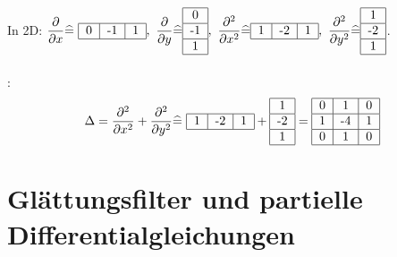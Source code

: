     In 2D: $\displaystyle \frac{\partial}{\partial x} \widehat = \ \begin{tabular}{|c|c|c|}
        \hline
        0 & -1 & 1\\
        \hline
    \end{tabular}, \ \frac{\partial}{\partial y} \widehat = \begin{tabular}{|c|}
        \hline
        0\\
        \hline
        -1\\
        \hline
        1\\
        \hline
    \end{tabular}, \ \frac{\partial^2}{\partial x^2} \widehat = \begin{tabular}{|c|c|c|}
        \hline
        1 & -2 & 1\\
        \hline
    \end{tabular}, \ \frac{\partial^2}{\partial y^2} \widehat = \begin{tabular}{|c|}
        \hline
        1\\
        \hline
        -2\\
        \hline
        1\\
        \hline
    \end{tabular}$.\\
    \ \\
    :
    \[\Delta = \frac{\partial^2}{\partial x^2} + \frac{\partial^2}{\partial y^2} \widehat = \ \begin{tabular}{|c|c|c|}
        \hline
        1 & -2 & 1\\
        \hline
    \end{tabular} + \begin{tabular}{|c|}
        \hline
        1\\
        \hline
        -2\\
        \hline
        1\\
        \hline
    \end{tabular} = \begin{tabular}{|c|c|c|}
        \hline
         0 & 1 & 0\\
        \hline
        1 & -4 & 1\\
        \hline
         0 & 1 & 0\\
        \hline
    \end{tabular}\]

\section{Glättungsfilter und partielle Differentialgleichungen}

